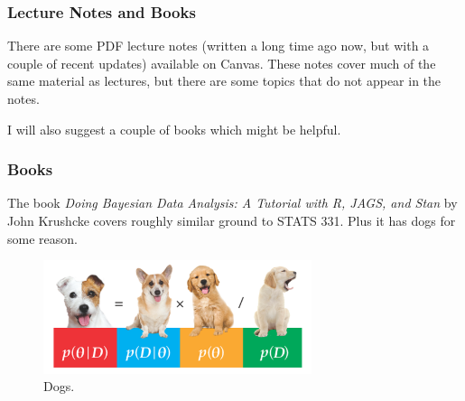 \documentclass{beamer}
\begin{document}
\begin{frame}
\frametitle{Lecture Notes and Books}
There are some PDF lecture notes (written a long time ago now, but with a
couple of recent updates) available on Canvas. These notes cover much of
the same material as lectures, but there are some topics that do not appear in
the notes.\\[1em] \pause

I will also suggest a couple of books which might be helpful.
\end{frame}


\begin{frame}
\frametitle{Books}
The book {\em Doing Bayesian Data Analysis: A Tutorial with R, JAGS, and Stan}
by John Krushcke covers roughly similar ground to STATS 331.
Plus it has dogs for some reason.

\begin{figure}[!h]
\includegraphics[width=0.7\textwidth]{images/dogs.png}
\caption{Dogs.\label{fig:dogs}}
\end{figure}



\end{frame}
\end{document}
